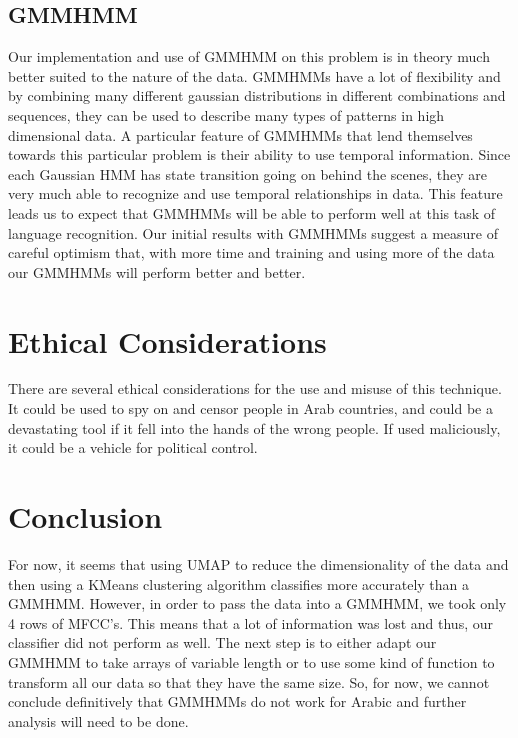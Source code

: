 \documentclass[11pt]{article}
\newcommand{\0}{{\vec  0 }}
\newcommand{\1}{{\mathbbm{  1} }}
\begin{document}
    \subsection{GMMHMM}
    Our implementation and use of GMMHMM on this problem is in theory much better suited to the nature of the data. GMMHMMs have a lot of flexibility and by combining many different gaussian distributions in different combinations and sequences, they can be used to describe many types of patterns in high dimensional data. A particular feature of GMMHMMs that lend themselves towards this particular problem is their ability to use temporal information. Since each Gaussian HMM has state transition going on behind the scenes, they are very much able to recognize and use temporal relationships in data. This feature leads us to expect that GMMHMMs will be able to perform well at this task of language recognition. 
    Our initial results with GMMHMMs suggest a measure of careful optimism that, with more time and training and using more of the data our GMMHMMs will perform better and better. 
    
    \section{Ethical Considerations}
    There are several ethical considerations for the use and misuse of this technique. It could be used to spy on and censor people in Arab countries, and could be a devastating tool if it fell into the hands of the wrong people. If used maliciously, it could be a vehicle for political control. 
    
    \section{Conclusion}
    For now, it seems that using UMAP to reduce the dimensionality of the data and then using a KMeans clustering algorithm classifies more accurately than a GMMHMM. However, in order to pass the data into a GMMHMM, we took only 4 rows of MFCC’s. This means that a lot of information was lost and thus, our classifier did not perform as well. The next step is to either adapt our GMMHMM to take arrays of variable length or to use some kind of function to transform all our data so that they have the same size. So, for now, we cannot conclude definitively that GMMHMMs do not work for Arabic and further analysis will need to be done.
    

    
    
    
\end{document}
